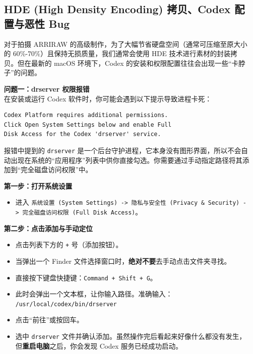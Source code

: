 \documentclass[10pt, a5paper]{article}
\begin{document}
\subsection{HDE (High Density Encoding) 拷贝、Codex 配置与恶性 Bug}

对于拍摄 ARRIRAW 的高级制作，为了大幅节省硬盘空间（通常可压缩至原大小的 60\%-70\%）且保持无损质量，我们通常会使用 HDE 技术进行素材的封装拷贝。但在最新的 macOS 环境下，Codex 的安装和权限配置往往会出现一些“卡脖子”的问题。

\textbf{问题一：drserver 权限报错} \\
在安装或运行 Codex 软件时，你可能会遇到以下提示导致进程卡死：

\begin{verbatim}
Codex Platform requires additional permissions. 
Click Open System Settings below and enable Full 
Disk Access for the Codex 'drserver' service.
\end{verbatim}

报错中提到的 \texttt{drserver} 是一个后台守护进程，它本身没有图形界面，所以不会自动出现在系统的“应用程序”列表中供你直接勾选。你需要通过手动指定路径将其添加到“完全磁盘访问权限”中。

\begin{tcolorbox}[colback=white, colframe=AlertRed, boxrule=1pt, arc=1mm, breakable, title={\textbf{解决 drserver 权限 Bug 的具体步骤}}]
\small
\textbf{第一步：打开系统设置}
\begin{itemize}
    \item 进入 \texttt{系统设置 (System Settings) -> 隐私与安全性 (Privacy \& Security) -> 完全磁盘访问权限 (Full Disk Access)}。
\end{itemize}

\textbf{第二步：点击添加与手动定位}
\begin{itemize}
    \item 点击列表下方的 \texttt{+} 号（添加按钮）。
    \item 当弹出一个 Finder 文件选择窗口时，\textbf{绝对不要}去手动点击文件夹寻找。
    \item 直接按下键盘快捷键：\texttt{Command + Shift + G}。
    \item 此时会弹出一个文本框，让你输入路径。准确输入：\\
          \texttt{/usr/local/codex/bin/drserver}
    \item 点击“前往”或按回车。
    \item 选中 \texttt{drserver} 文件并确认添加。虽然操作完后看起来好像什么都没有发生，但\textbf{重启电脑}之后，你会发现 Codex 服务已经成功启动。
\end{itemize}
\end{tcolorbox}
\end{document}
